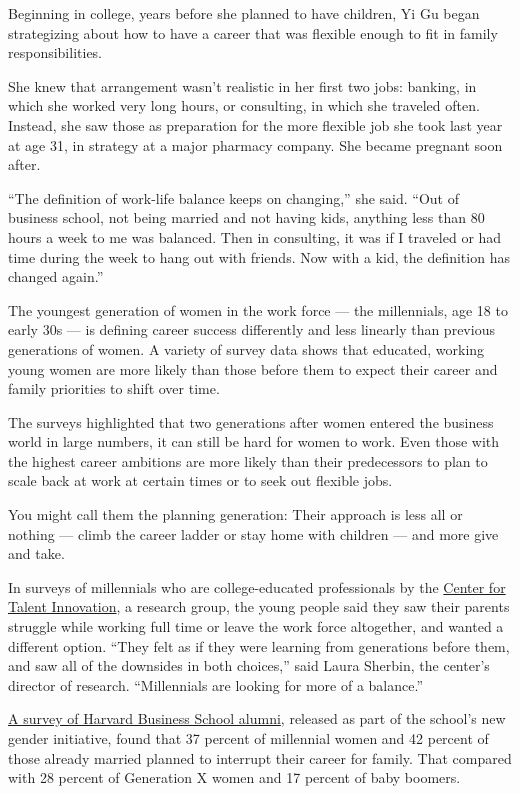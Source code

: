 Beginning in college, years before she planned to have children, Yi Gu
began strategizing about how to have a career that was flexible enough
to fit in family responsibilities.

She knew that arrangement wasn't realistic in her first two jobs:
banking, in which she worked very long hours, or consulting, in which
she traveled often. Instead, she saw those as preparation for the more
flexible job she took last year at age 31, in strategy at a major
pharmacy company. She became pregnant soon after.

``The definition of work-life balance keeps on changing,'' she said.
``Out of business school, not being married and not having kids,
anything less than 80 hours a week to me was balanced. Then in
consulting, it was if I traveled or had time during the week to hang out
with friends. Now with a kid, the definition has changed again.''

The youngest generation of women in the work force --- the millennials,
age 18 to early 30s --- is defining career success differently and less
linearly than previous generations of women. A variety of survey data
shows that educated, working young women are more likely than those
before them to expect their career and family priorities to shift over
time.

The surveys highlighted that two generations after women entered the
business world in large numbers, it can still be hard for women to work.
Even those with the highest career ambitions are more likely than their
predecessors to plan to scale back at work at certain times or to seek
out flexible jobs.

You might call them the planning generation: Their approach is less all
or nothing --- climb the career ladder or stay home with children ---
and more give and take.

In surveys of millennials who are college-educated professionals by the
\href{http://www.talentinnovation.org/}{Center for Talent Innovation}, a
research group, the young people said they saw their parents struggle
while working full time or leave the work force altogether, and wanted a
different option. ``They felt as if they were learning from generations
before them, and saw all of the downsides in both choices,'' said Laura
Sherbin, the center's director of research. ``Millennials are looking
for more of a balance.''

\href{http://www.hbs.edu/women50/docs/L_and_L_Survey_2Findings_12final.pdf}{A
survey of Harvard Business School alumni}, released as part of the
school's new gender initiative, found that 37 percent of millennial
women and 42 percent of those already married planned to interrupt their
career for family. That compared with 28 percent of Generation X women
and 17 percent of baby boomers.

